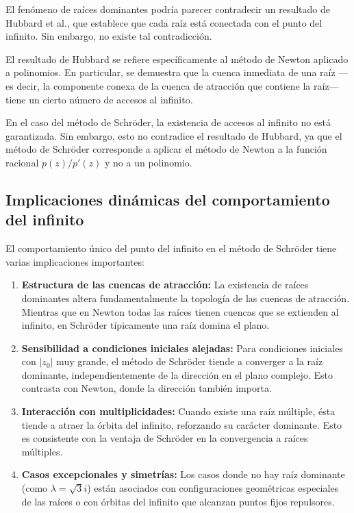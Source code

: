 El fenómeno de raíces dominantes podría parecer contradecir un resultado de Hubbard et al., que establece que cada raíz está conectada con el punto del infinito. Sin embargo, no existe tal contradicción.

El resultado de Hubbard se refiere específicamente al método de Newton aplicado a polinomios. En particular, se demuestra que la cuenca inmediata de una raíz ---es decir, la componente conexa de la cuenca de atracción que contiene la raíz--- tiene un cierto número de accesos al infinito.

En el caso del método de Schröder, la existencia de accesos al infinito no está garantizada. Sin embargo, esto no contradice el resultado de Hubbard, ya que el método de Schröder corresponde a aplicar el método de Newton a la función racional $p(z)/p'(z)$ y no a un polinomio.

\subsection{Implicaciones dinámicas del comportamiento del infinito}

El comportamiento único del punto del infinito en el método de Schröder tiene varias implicaciones importantes:

\begin{enumerate}
\item \textbf{Estructura de las cuencas de atracción:} La existencia de raíces dominantes altera fundamentalmente la topología de las cuencas de atracción. Mientras que en Newton todas las raíces tienen cuencas que se extienden al infinito, en Schröder típicamente una raíz domina el plano.

\item \textbf{Sensibilidad a condiciones iniciales alejadas:} Para condiciones iniciales con $|z_0|$ muy grande, el método de Schröder tiende a converger a la raíz dominante, independientemente de la dirección en el plano complejo. Esto contrasta con Newton, donde la dirección también importa.

\item \textbf{Interacción con multiplicidades:} Cuando existe una raíz múltiple, ésta tiende a atraer la órbita del infinito, reforzando su carácter dominante. Esto es consistente con la ventaja de Schröder en la convergencia a raíces múltiples.

\item \textbf{Casos excepcionales y simetrías:} Los casos donde no hay raíz dominante (como $\lambda=\sqrt{3}i$) están asociados con configuraciones geométricas especiales de las raíces o con órbitas del infinito que alcanzan puntos fijos repulsores.
\end{enumerate}

